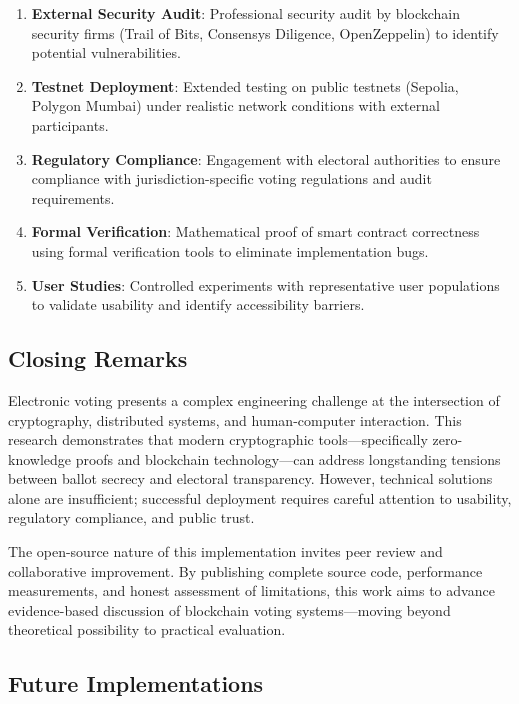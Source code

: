 \documentclass[conference]{IEEEtran}
\begin{document}
\begin{enumerate}
    \item \textbf{External Security Audit}: Professional security audit by blockchain security firms (Trail of Bits, Consensys Diligence, OpenZeppelin) to identify potential vulnerabilities.
    
    \item \textbf{Testnet Deployment}: Extended testing on public testnets (Sepolia, Polygon Mumbai) under realistic network conditions with external participants.
    
    \item \textbf{Regulatory Compliance}: Engagement with electoral authorities to ensure compliance with jurisdiction-specific voting regulations and audit requirements.
    
    \item \textbf{Formal Verification}: Mathematical proof of smart contract correctness using formal verification tools to eliminate implementation bugs.
    
    \item \textbf{User Studies}: Controlled experiments with representative user populations to validate usability and identify accessibility barriers.
\end{enumerate}

\subsection{Closing Remarks}

Electronic voting presents a complex engineering challenge at the intersection of cryptography, distributed systems, and human-computer interaction. This research demonstrates that modern cryptographic tools---specifically zero-knowledge proofs and blockchain technology---can address longstanding tensions between ballot secrecy and electoral transparency. However, technical solutions alone are insufficient; successful deployment requires careful attention to usability, regulatory compliance, and public trust.

The open-source nature of this implementation invites peer review and collaborative improvement. By publishing complete source code, performance measurements, and honest assessment of limitations, this work aims to advance evidence-based discussion of blockchain voting systems---moving beyond theoretical possibility to practical evaluation.

\subsection{Future Implementations}
\end{document}
